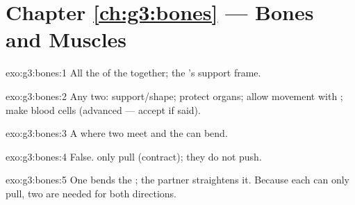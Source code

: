 \section*{Chapter \ref{ch:g3:bones} --- Bones and Muscles}

\begin{solution}{exo:g3:bones:1}
All the  of the  together; the 's support frame.
\end{solution}

\begin{solution}{exo:g3:bones:2}
Any two: support/shape; protect organs; allow movement with ;
make blood cells (advanced --- accept if said).
\end{solution}

\begin{solution}{exo:g3:bones:3}
A  where two  meet and the  can bend.
\end{solution}

\begin{solution}{exo:g3:bones:4}
False.  only pull (contract); they do not push.
\end{solution}

\begin{solution}{exo:g3:bones:5}
One  bends the ; the partner straightens it. Because
each can only pull, two are needed for both directions.
\end{solution}

